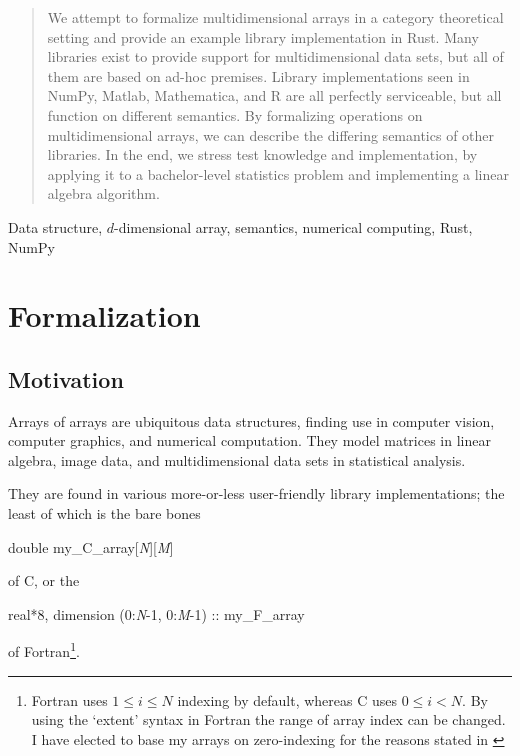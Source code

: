 \documentclass{DIKU-report-variant}
\begin{document}
\maketitle

\thispagestyle{plain}
\begin{abstract}
  We attempt to formalize multidimensional arrays in a category theoretical
  setting and provide an example library implementation in Rust.
  Many libraries exist to provide support for multidimensional data sets, but all
  of them are based on ad-hoc premises.
  Library implementations seen in NumPy, Matlab, Mathematica, and R are all
  perfectly serviceable, but all function on different semantics.
  By formalizing operations on multidimensional arrays, we can
  describe the differing semantics of other libraries.
  In the end, we stress test knowledge and implementation, by applying it to
  a bachelor-level statistics problem and implementing a linear algebra algorithm.
\end{abstract}

\begin{keywords}
  Data structure, \(d\)-dimensional array, semantics, numerical computing, Rust, NumPy
\end{keywords}

\setcounter{tocdepth}{2}
\tableofcontents

\chapter{Formalization}

\section{Motivation}

Arrays of arrays are ubiquitous data structures, finding use
in computer vision, computer graphics, and numerical computation.
They model matrices in linear algebra, image data, and multidimensional data sets in statistical analysis.

They are found in various more-or-less user-friendly library implementations;
the least of which is the bare bones
\begin{center}
\ttfamily double my\_C\_array[\textit{N}][\textit{M}]
\end{center}
of C, or the
\begin{center}
\ttfamily real*8, dimension (0:\textit{N}-1, 0:\textit{M}-1) :: my\_F\_array
\end{center}
of Fortran\footnote{Fortran uses \(1\le i\le N\) indexing by default, whereas C uses \(0\le i<N\).
By using the `extent' syntax in Fortran the range of array index can be changed. I have elected
to base my arrays on zero-indexing for the reasons stated in \cite{EWD831}}.
\end{document}
